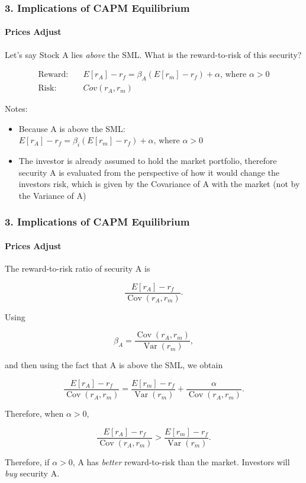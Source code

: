 \documentclass{beamer}
\begin{document}
\begin{frame}[t]
    \frametitle{3. Implications of CAPM Equilibrium}
    \framesubtitle{Prices Adjust}

    Let's say Stock A lies \textit{above} the SML.  What is the reward-to-risk of this security?
    
    $$
    \begin{aligned}
    \text{Reward:} &\quad E[r_{A}]-r_f = \beta_{A}(E[r_m]-r_f) + \alpha\text{, where }\alpha>0 \\
    \text{Risk:} &\quad Cov(r_{A},r_m) 
    \end{aligned}
    $$

    Notes:
    \begin{itemize}
        \item Because A is above the SML: $E[r_{A}]-r_f = \beta_i(E[r_m]-r_f) + \alpha\text{, where }\alpha>0$
        \item The investor is already assumed to hold the market portfolio, therefore security A is evaluated from the perspective of how it would change the investors risk, which is given by the Covariance of A with the market (not by the Variance of A)
    \end{itemize}
   
\end{frame}

\begin{frame}[t]
    \frametitle{3. Implications of CAPM Equilibrium}
    \framesubtitle{Prices Adjust}

    \footnotesize
    The reward-to-risk ratio of security A is

\[
\frac{E[r_A]-r_f}
     {\operatorname{Cov}(r_A,r_m)}.
\]

Using

\[
\beta_A
=
\frac{\operatorname{Cov}(r_A,r_m)}
     {\operatorname{Var}(r_m)},
\]

and then using the fact that A is above the SML, we obtain

\[
\frac{E[r_A]-r_f}
     {\operatorname{Cov}(r_A,r_m)}
=
\frac{E[r_m]-r_f}{\operatorname{Var}(r_m)}
+
\frac{\alpha}
     {\operatorname{Cov}(r_A,r_m)}.
\]

Therefore, when $\alpha>0$,

\[
\frac{E[r_A]-r_f}
     {\operatorname{Cov}(r_A,r_m)}
>
\frac{E[r_m]-r_f}
     {\operatorname{Var}(r_m)}.
\]


    Therefore, if $\alpha > 0$, A has \textit{better} reward-to-risk than the market.   Investors will \textit{buy} security A.

\end{frame}
\end{document}
